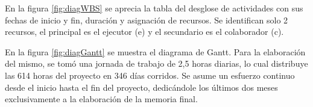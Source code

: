 \documentclass[
11pt, %
]{charter}
\begin{document}
%

%

En la figura \ref{fig:diagWBS} se aprecia la tabla del desglose de actividades con sus fechas de inicio y fin, duración y asignación de recursos. Se identifican solo 2 recursos, el principal es el ejecutor (e) y el secundario es el colaborador (c).

En la figura \ref{fig:diagGantt} se muestra el diagrama de Gantt. Para la elaboración del mismo, se tomó una jornada de trabajo de 2,5 horas diarias, lo cual distribuye las 614 horas del proyecto en 346 días corridos. Se asume un esfuerzo continuo desde el inicio hasta el fin del proyecto, dedicándole los últimos dos meses exclusivamente a la elaboración de la memoria final.
\end{document}
